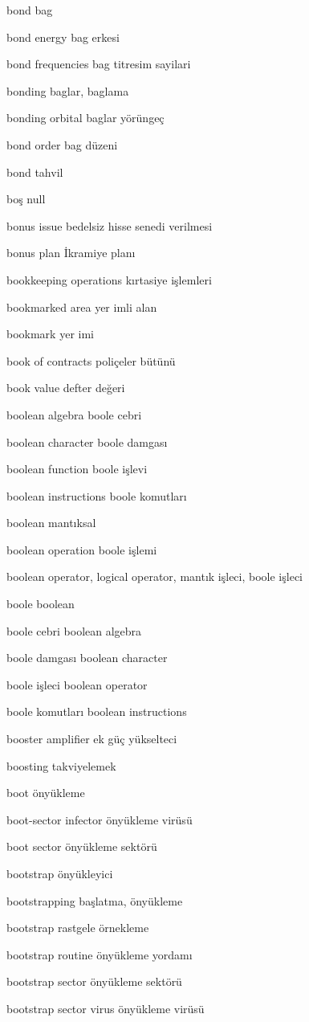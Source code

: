 \documentclass[12pt,fleqn]{article}\usepackage{../../common}
\begin{document}
bond bag

bond energy bag erkesi

bond frequencies bag titresim sayilari

bonding baglar, baglama

bonding orbital baglar yörüngeç

bond order bag düzeni

bond tahvil

boş null

bonus issue bedelsiz hisse senedi verilmesi

bonus plan İkramiye planı

bookkeeping operations kırtasiye işlemleri

bookmarked area yer imli alan

bookmark yer imi

book of contracts poliçeler bütünü

book value defter değeri

boolean algebra boole cebri

boolean character boole damgası

boolean function boole işlevi

boolean instructions boole komutları

boolean mantıksal

boolean operation boole işlemi

boolean operator, logical operator, mantık işleci, boole işleci

boole boolean

boole cebri boolean algebra

boole damgası boolean character

boole işleci boolean operator

boole komutları boolean instructions

booster amplifier ek güç yükselteci

boosting takviyelemek

boot önyükleme

boot-sector infector önyükleme virüsü

boot sector önyükleme sektörü

bootstrap önyükleyici

bootstrapping başlatma, önyükleme

bootstrap rastgele örnekleme

bootstrap routine önyükleme yordamı

bootstrap sector önyükleme sektörü

bootstrap sector virus önyükleme virüsü
\end{document}
